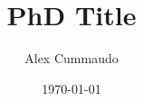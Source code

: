 \title{PhD Title}
\author{Alex Cummaudo}
\date{\today}

\def \thedegree {Doctor of Philosophy}
\def \theinstitution {Applied Artificial Intelligence Institute\\Deakin University\\Melbourne, Australia}
\def \theauthorspostnominals {BSc \textit{Swinburne}, BIT(Hons)}